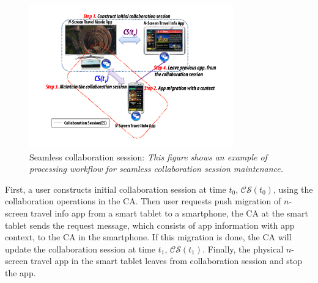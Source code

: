 \documentclass[conference]{IEEEtran}
\begin{document}
%
    \begin{figure}[htb] %
    \centering
    \includegraphics[width=8.8cm,keepaspectratio]{seamless}
    \caption{Seamless collaboration session: \emph{This figure shows an example of processing workflow for seamless collaboration session maintenance.}}
    \label{fig:pushmigration}
    \end{figure}

First, a user constructs initial collaboration session at time $t_0$, $\mathcal{CS}(t_0)$, using the collaboration operations in the CA.
Then user requests push migration of $n$-screen travel info app from a smart tablet to a smartphone, the CA at the smart tablet sends the request message, which consists of app information with app context, to the CA in the smartphone. If this migration is done, the CA will update the collaboration session at time $t_1$, $\mathcal{CS}(t_1)$. Finally, the physical $n$-screen travel app in the smart tablet leaves from collaboration session and stop the app. 
\end{document}
